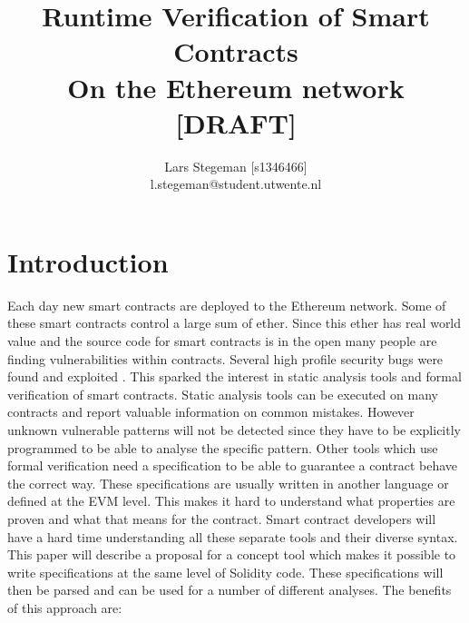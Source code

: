 \documentclass[a4paper]{article}
\title{Runtime Verification of Smart Contracts \\
\large On the Ethereum network [DRAFT] \\}
\author{Lars Stegeman [s1346466]\\ l.stegeman@student.utwente.nl}
\begin{document}
\maketitle

\tableofcontents


\section{Introduction}
Each day new smart contracts are deployed to the Ethereum network. Some of these smart contracts control a large sum of ether. Since this ether has real world value and the source code for smart contracts is in the open many people are finding vulnerabilities within contracts. Several high profile security bugs were found and exploited \cite{parity1, parity2,hkg,dao}. This sparked the interest in static analysis tools and formal verification of smart contracts. Static analysis tools can be executed on many contracts and report valuable information on common mistakes. However unknown vulnerable patterns will not be detected since they have to be explicitly programmed to be able to analyse the specific pattern. Other tools which use formal verification need a specification to be able to guarantee a contract behave the correct way. These specifications are usually written in another language or defined at the EVM level. This makes it hard to understand what properties are proven and what that means for the contract. Smart contract developers will have a hard time understanding all these separate tools and their diverse syntax. This paper will describe a proposal for a concept tool which makes it possible to write specifications at the same level of Solidity code. These specifications will then be parsed and can be used for a number of different analyses. The benefits of this approach are:
\end{document}
